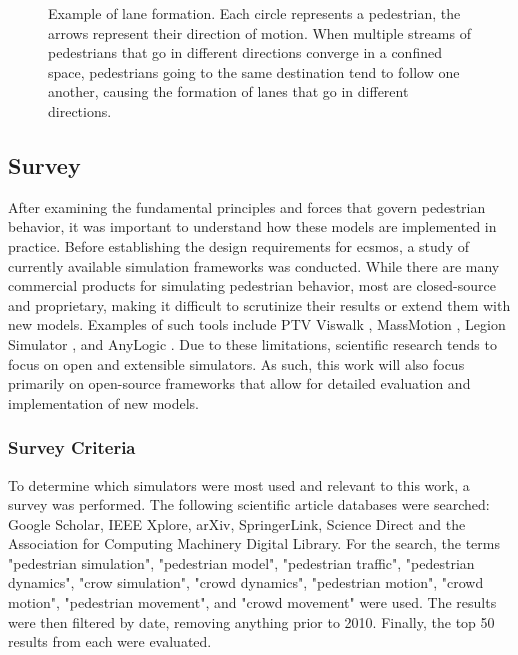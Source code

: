 \documentclass[twoside, 11pt]{article}
\begin{document}
\begin{figure}[!h]
  \centering
  
  \caption[Example of lane formation]{Example of lane formation. Each circle represents a pedestrian, the arrows represent their direction of motion. When multiple streams of pedestrians that go in different directions converge in a confined space, pedestrians going to the same destination tend to follow one another, causing the formation of lanes that go in different directions.}
  \label{fig:lane-formation}
\end{figure}

\subsection{Survey} \label{sec:existing-frameworks}

After examining the fundamental principles and forces that govern pedestrian behavior, it was important to understand how these models are implemented in practice. Before establishing the design requirements for \gls{ecsmos}, a study of currently available simulation frameworks was conducted. While there are many commercial products for simulating pedestrian behavior, most are closed-source and proprietary, making it difficult to scrutinize their results or extend them with new models. Examples of such tools include PTV Viswalk \cite{viswalk}, MassMotion \cite{massmotion}, Legion Simulator \cite{legionsimulator}, and AnyLogic \cite{anylogic}. Due to these limitations, scientific research tends to focus on open and extensible simulators. As such, this work will also focus primarily on open-source frameworks that allow for detailed evaluation and implementation of new models.

\subsubsection{Survey Criteria}

To determine which simulators were most used and relevant to this work, a survey was performed. The following scientific article databases were searched: Google Scholar, IEEE Xplore, arXiv, SpringerLink, Science Direct and the Association for Computing Machinery Digital Library. For the search, the terms "pedestrian simulation", "pedestrian model", "pedestrian traffic", "pedestrian dynamics", "crow simulation", "crowd dynamics", "pedestrian motion", "crowd motion", "pedestrian movement", and "crowd movement" were used.
The results were then filtered by date, removing anything prior to 2010. Finally, the top 50 results from each were evaluated.
\end{document}
